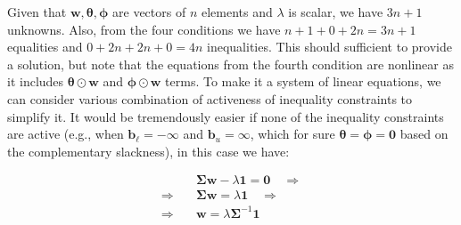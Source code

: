 \documentclass{beamer}
\begin{document}
\begin{frame}

\justifying
Given that $\mathbf{w}, \boldsymbol\theta, \boldsymbol\phi$ are vectors of $n$ elements and $\lambda$ is scalar, we have $3n+1$ unknowns. Also, from the four conditions we have $n+1+0+2n=3n+1$ equalities and $0+2n+2n+0=4n$ inequalities. This should sufficient to provide a solution, but note that the equations from the fourth condition are nonlinear as it includes $\boldsymbol\theta \odot \mathbf{w}$ and $\boldsymbol\phi \odot \mathbf{w}$ terms. To make it a system of linear equations, we can consider various combination of activeness of inequality constraints to simplify it. It would be tremendously easier if none of the inequality constraints are active (e.g., when $\mathbf{b}_{\ell} = -\boldsymbol\infty$ and $\mathbf{b}_{u} = \boldsymbol\infty$, which for sure $\boldsymbol\theta=\boldsymbol\phi=\mathbf{0}$ based on the complementary slackness), in this case we have:

\justifying
\begin{equation*}
\begin{aligned}
	& \mathbf{\Sigma}\mathbf{w} - \lambda \mathbf{1} = \mathbf{0} \quad \Rightarrow \\
	\Rightarrow \quad & \mathbf{\Sigma}\mathbf{w} = \lambda \mathbf{1} \quad \Rightarrow \\
	\Rightarrow \quad & \mathbf{w} = \lambda \mathbf{\Sigma}^{-1}\mathbf{1} \\
\end{aligned}
\end{equation*}



\end{frame}
\end{document}
